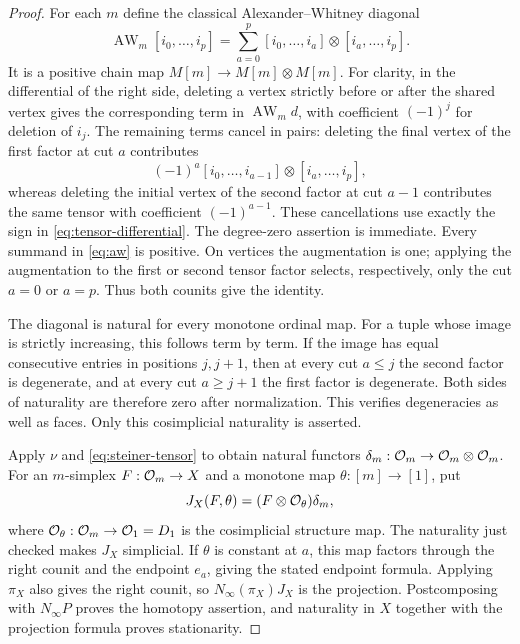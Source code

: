 \begin{proof}
For each $m$ define the classical Alexander--Whitney diagonal
\cite[IV.2, Remark~2.5]{GoerssJardine1999}
\begin{equation}\label{eq:aw}
 \operatorname{AW}_m[i_0,\ldots,i_p]
   =\sum_{a=0}^{p}
      [i_0,\ldots,i_a]\otimes[i_a,\ldots,i_p].
\end{equation}
It is a positive chain map $M[m]\to M[m]\otimes M[m]$.
For clarity, in the differential of the right side, deleting a vertex
strictly before or after the shared vertex gives the corresponding
term in $\operatorname{AW}_m d$, with coefficient $(-1)^j$ for
deletion of $i_j$.  The remaining terms cancel in pairs: deleting
the final vertex of the first factor at cut $a$ contributes
\[
 (-1)^a[i_0,\ldots,i_{a-1}]\otimes[i_a,\ldots,i_p],
\]
whereas deleting the initial vertex of the second factor at cut
$a-1$ contributes the same tensor with coefficient $(-1)^{a-1}$.
These cancellations use exactly the sign in
\eqref{eq:tensor-differential}.  The degree-zero assertion is
immediate.  Every summand in \eqref{eq:aw} is positive.
On vertices the augmentation is one; applying the augmentation to
the first or second tensor factor selects, respectively, only the
cut $a=0$ or $a=p$.  Thus both counits give the identity.

The diagonal is natural for every monotone ordinal map.  For a tuple
whose image is strictly increasing, this follows term by term.  If
the image has equal consecutive entries in positions $j,j+1$, then
at every cut $a\le j$ the second factor is degenerate, and at every
cut $a\ge j+1$ the first factor is degenerate.  Both sides of
naturality are therefore zero after normalization.  This verifies
degeneracies as well as faces.  Only this cosimplicial naturality is
asserted.

Apply $\nu$ and \eqref{eq:steiner-tensor} to obtain natural functors
$\delta_m:\mathcal O_{m}\to\mathcal O_{m}\otimes\mathcal O_{m}$.
For an $m$-simplex $F:\mathcal O_{m}\to X$ and a monotone map
$\theta:[m]\to[1]$, put
\[
 J_X(F,\theta)
   =(F\otimes\mathcal O_{\theta})\delta_m,
\]
where $\mathcal O_{\theta}:\mathcal O_{m}\to\mathcal O_{1}=D_{1}$ is the
cosimplicial structure map.  The naturality just checked makes
$J_X$ simplicial.  If $\theta$ is constant at $a$, this map factors
through the right counit and the endpoint $e_a$, giving the stated
endpoint formula.  Applying $\pi_X$ also gives the right counit,
so $N_\infty(\pi_X)J_X$ is the projection.  Postcomposing with
$N_\infty P$ proves the homotopy assertion, and naturality in $X$
together with the projection formula proves stationarity.
\end{proof}

